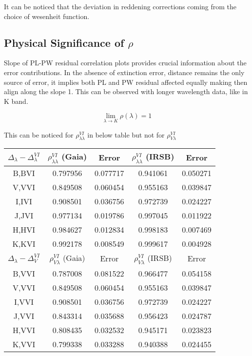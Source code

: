 \documentclass[12pt,a4paper]{article}
\begin{document}
It can be noticed that the deviation in reddening corrections coming from the choice of wesenheit function. 

\subsection{Physical Significance of $\rho$}

Slope of PL-PW residual correlation plots provides crucial information about the error contributions. In the absence of extinction error, distance remains the only source of error, it implies both PL and PW residual affected equally making then align along the slope 1. This can be observed with longer wavelength data, like in K band. 

$$\lim_{\lambda \to K} \rho (\lambda) = 1$$

This can be noticed for $\rho_{\lambda \lambda}^{VI}$ in below table but not for $\rho_{V \lambda}^{VI}$
 
\begin{table}[h]
	\centering
	\small
	\renewcommand{\arraystretch}{1.5}
	\begin{tabular}{|c|cc|cc|}
		\hline
  	$\Delta_\lambda - \Delta_\lambda^{VI}$ &        $\rho_{\lambda \lambda}^{VI}$ (Gaia) &    Error & $\rho_{\lambda \lambda}^{VI}$ (IRSB) &    Error \\
\hline
	B,BVI &  0.797956 &  0.077717 &  0.941061 &  0.050271 \\
	V,VVI &  0.849508 &  0.060454 &  0.955163 &  0.039847 \\
	I,IVI &  0.908501 &  0.036756 &  0.972739 &  0.024227 \\
	J,JVI &  0.977134 &  0.019786 &  0.997045 &  0.011922 \\
	H,HVI &  0.984627 &  0.012834 &  0.998183 &  0.007469 \\
	K,KVI &  0.992178 &  0.008549 &  0.999617 &  0.004928 \\
    \hline
  	$\Delta_\lambda - \Delta_V^{VI}$ &        $\rho_{V \lambda}^{VI}$ (Gaia) &    Error & $\rho_{V \lambda}^{VI}$ (IRSB) &    Error \\
\hline
    B,VVI &  	0.787008 		&  0.081522 &  0.966477 &  0.054158 \\
	V,VVI &  0.849508 &  0.060454 &  0.955163 &  0.039847 \\
	I,VVI &  0.908501 &  0.036756 &  0.972739 &  0.024227 \\
	J,VVI &  0.843314 &  0.035688 &  0.956423 &  0.024787 \\
	H,VVI &  0.808435 &  0.032532 &  0.945171 &  0.023823 \\
	K,VVI &  0.799338 &  0.033288 &  0.940388 &  0.024455 \\
\hline

	\end{tabular}
	\label{tab:symbols}
\end{table}
\end{document}
